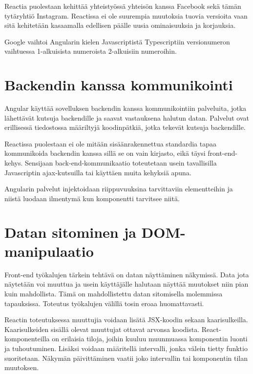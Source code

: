 \documentclass[a4paper,12pt,twoside]{article} %
\begin{document}
\vspace{4mm}\noindent
Reactia puolestaan kehittää yhteistyössä yhteisön kanssa Facebook sekä tämän tytäryhtiö Instagram. Reactissa ei ole suurempia muutoksia tuovia versioita vaan sitä kehitetään kasaamalla edellisen päälle uusia ominaisuuksia ja korjauksia.

\vspace{4mm}\noindent
Google vaihtoi Angularin kielen Javascriptistä Typescriptiin versionumeron vaihtuessa 1-alkuisista numeroista 2-alkuisiin numeroihin.

\newpage


\section{Backendin kanssa kommunikointi}

Angular käyttää sovelluksen backendin kanssa kommunikointiin palveluita, jotka lähettävät kutsuja backendille ja saavat vastauksena halutun datan. Palvelut ovat erillisessä tiedostossa määriltyjä koodinpätkiä, jotka tekevät kutsuja backendille.

\vspace{4mm}\noindent
Reactissa puolestaan ei ole mitään sisäänrakennettua standardia tapaa kommunikoida backendin kanssa sillä se on vain kirjasto, eikä täysi front-end-kehys. Sensijaan back-end-kommunikaatio toteutetaan usein tavallisilla Javascriptin ajax-kutsuilla tai käyttäen muita kehyksiä apuna.

\vspace{4mm}\noindent
Angularin palvelut injektoidaan riippuvuuksina tarvittaviin elementteihin ja niistä luodaan ilmentymä kun komponentti tarvitsee niitä. 

\newpage

\section{Datan sitominen ja DOM-manipulaatio}

Front-end työkalujen tärkein tehtävä on datan näyttäminen näkymissä. Data jota näytetään voi muuttua ja usein käyttäjälle halutaan näyttää muutokset niin pian kuin mahdollista. Tämä on mahdollistettu datan sitomisella molemmissa tapauksissa. Toteutus työkalujen välillä tosin eroaa huomattavasti.

\vspace{4mm}\noindent Reactin toteutuksessa muuttujia voidaan lisätä JSX-koodin sekaan kaarisulkeilla. Kaarisulkeiden sisällä olevat muuttujat ottavat arvonsa koodista. React-komponenteilla on erilaisia tiloja, joihin kuuluu muunmuassa komponentin luonti ja tuhoutuminen. Lisäksi voidaan määritellä intervalli, jonka välein tietty funktio suoritetaan. Näkymän päivittäminen vaatii joko intervallin tai komponentin tilan muutoksen.
\end{document}
